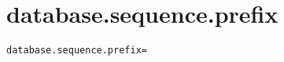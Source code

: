 \section{database.sequence.prefix}
\label{configuration:DatabaseSequencePrefix}
\AvailableInJavaOnly{\TODO}
\begin{lstlisting}[style=Props,caption={Usage example for \textit{database.sequence.prefix}}]
database.sequence.prefix=
\end{lstlisting}